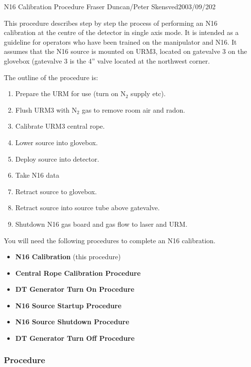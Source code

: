              {N16 Calibration Procedure}
             {Fraser Duncan/Peter Skensved}{2003/09/20}{2}

  
  This procedure describes step by step the process of performing an
N16  calibration at the centre of the detector in single axis mode.  It is intended as
a guideline for operators who have been trained on the manipulator
and N16.  It assumes that the N16 source is mounted on URM3,
located on gatevalve 3 on the glovebox (gatevalve 3 is the 4''
valve located at the northwest corner.
  


\noindent 
  The outline of the procedure is:
\begin{enumerate}
\item Prepare the URM for use (turn on N$_2$ supply etc).
\item Flush URM3 with N$_2$ gas to remove room air and radon.
\item Calibrate URM3 central rope.
\item Lower source into glovebox.
\item Deploy source into detector.
\item Take N16 data
\item Retract source to glovebox.
\item Retract source into source tube above gatevalve.
\item Shutdown N16 gas board and gas flow to laser and URM.
\end{enumerate}
  
\vspace*{0.25in}
\noindent 
You will need the following procedures to complete an N16
calibration.
\begin{itemize}
\item {\bf N16 Calibration} (this procedure) 
\item {\bf Central Rope Calibration Procedure}
\item {\bf DT Generator Turn On Procedure}
\item {\bf N16 Source Startup Procedure}
\item {\bf N16 Source Shutdown Procedure}
\item {\bf DT Generator Turn Off Procedure}

\end{itemize}

\newpage
\subsubsection{Procedure}
~\\

